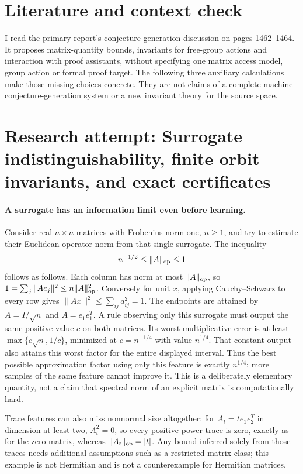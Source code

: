 \documentclass[11pt]{article}
\begin{document}
\section{Literature and context check}

I read the primary report's conjecture-generation discussion on pages 1462--1464.
It proposes matrix-quantity bounds, invariants for free-group actions and
interaction with proof assistants, without specifying one matrix access model,
group action or formal proof target. The following three auxiliary calculations
make those missing choices concrete. They are not claims of a complete machine
conjecture-generation system or a new invariant theory for the source space.

\section{Research attempt: Surrogate indistinguishability, finite orbit invariants, and exact certificates}

\paragraph{A surrogate has an information limit even before learning.}
Consider real $n\times n$ matrices with Frobenius norm one, $n\geq1$, and
try to estimate their Euclidean operator norm from that single surrogate.
The inequality
\[
 n^{-1/2}\leq\|A\|_{\rm op}\leq1
\]
follows as follows. Each column has norm at most $\|A\|_{\rm op}$, so
$1=\sum_j\|Ae_j\|^2\leq n\|A\|_{\rm op}^2$.
Conversely for unit $x$, applying Cauchy--Schwarz to every row gives
$\|Ax\|^2\leq\sum_{ij}a_{ij}^2=1$.
The endpoints are attained by $A=I/\sqrt n$ and $A=e_1e_1^T$.
A rule observing only this surrogate must output the same positive value $c$
on both matrices. Its worst multiplicative error is at least
$\max\{c\sqrt n,1/c\}$, minimized at $c=n^{-1/4}$ with value $n^{1/4}$.
That constant output also attains this worst factor for the entire displayed
interval. Thus the best possible approximation factor using only this feature
is exactly $n^{1/4}$; more samples of the same feature cannot improve it.
This is a deliberately elementary quantity, not a claim that spectral norm of
an explicit matrix is computationally hard.

Trace features can also miss nonnormal size altogether: for
$A_t=t e_1e_2^T$ in dimension at least two, $A_t^2=0$, so every positive-power
trace is zero, exactly as for the zero matrix, whereas $\|A_t\|_{\rm op}=|t|$.
Any bound inferred solely from those traces needs additional assumptions such
as a restricted matrix class; this example is not Hermitian and is not a
counterexample for Hermitian matrices.
\end{document}

